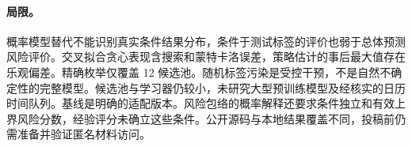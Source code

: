 \documentclass[runningheads]{llncs}
\begin{document}
\paragraph{局限。}概率模型替代不能识别真实条件结果分布，条件于测试标签的评价也弱于总体预测风险评价。交叉拟合贪心表现含搜索和蒙特卡洛误差，策略估计的事后最大值存在乐观偏差。精确枚举仅覆盖 12 候选池。随机标签污染是受控干预，不是自然不确定性的完整模型。候选池与学习器仍较小，未研究大型预训练模型及经核实的日历时间队列。基线是明确的适配版本。风险包络的概率解释还要求条件独立和有效上界风险分数，经验评分未确立这些条件。公开源码与本地结果覆盖不同，投稿前仍需准备并验证匿名材料访问。



\end{document}
